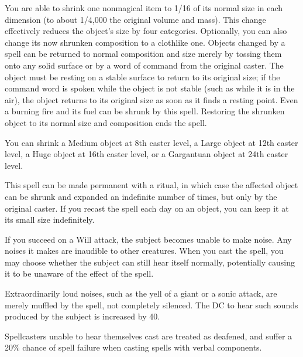 \begin{spelleffect}
    You are able to shrink one nonmagical item to 1/16 of its normal size in each dimension (to about 1/4,000 the original volume and mass). This change effectively reduces the object's size by four categories. Optionally, you can also change its now shrunken composition to a clothlike one. Objects changed by a  spell can be returned to normal composition and size merely by tossing them onto any solid surface or by a word of command from the original caster. The object must be resting on a stable surface to return to its original size; if the command word is spoken while the object is not stable (such as while it is in the air), the object returns to its original size as soon as it finds a resting point. Even a burning fire and its fuel can be shrunk by this spell. Restoring the shrunken object to its normal size and composition ends the spell.
    \par You can shrink a Medium object at 8th caster level, a Large object at 12th caster level, a Huge object at 16th caster level, or a Gargantuan object at 24th caster level.
\end{spelleffect}
\begin{spellnotes}
    This spell can be made permanent with a  ritual, in which case the affected object can be shrunk and expanded an indefinite number of times, but only by the original caster. If you recast the spell each day on an object, you can keep it at its small size indefinitely.
\end{spellnotes}

\spelldur{\durshort \dismissable}
\begin{spelleffect}
    If you succeed on a Will attack, the subject becomes unable to make noise. Any noises it makes are inaudible to other creatures. When you cast the spell, you may choose whether the subject can still hear itself normally, potentially causing it to be unaware of the effect of the spell.

    Extraordinarily loud noises, such as the yell of a giant or a sonic attack, are merely muffled by the spell, not completely silenced. The DC to hear such sounds produced by the subject is increased by 40.
\end{spelleffect}
\begin{spellnotes}
    Spellcasters unable to hear themselves cast are treated as deafened, and suffer a 20\% chance of spell failure when casting spells with verbal components.
\end{spellnotes}

